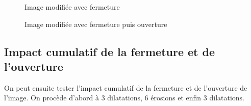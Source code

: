 \documentclass[french,a4paper,10pt]{article}
\begin{document}
\begin{figure}[!htb]
\begin{minipage}{0.30\textwidth}
			\caption{Image modifiée avec fermeture}\label{Fig:fermeture-ouverture-test-grey-08}
		\end{minipage}
		\begin{minipage}{0.30\textwidth}
			\centering
			\caption{Image modifiée avec fermeture puis ouverture}\label{Fig:ouverture-fermeture-test-grey-08}
		\end{minipage}
	\end{figure}

	\subsection{Impact cumulatif de la fermeture et de l'ouverture}\label{subsec:3.4}

	On peut ensuite tester l'impact cumulatif de la fermeture et de l'ouverture de l'image.
	On procède d'abord à 3 dilatations, 6 érosions et enfin 3 dilatations.
\end{document}
